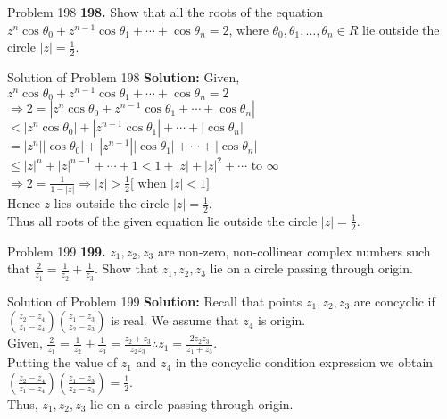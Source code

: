 \documentclass[aspectratio=169,8pt]{beamer}
\begin{document}
\begin{frame}{Problem 198}
  \textbf{198.} Show that all the roots of the equation $z^n\cos\theta_0 + z^{n - 1}\cos\theta_1 + \cdots + \cos\theta_n = 2$,
  where $\theta_0, \theta_1, \ldots, \theta_n\in R$ lie outside the circle $|z| = \frac{1}{2}$.
\end{frame}
\begin{frame}{Solution of Problem 198}
  \textbf{Solution:} Given, $z^n\cos\theta_0 + z^{n - 1}\cos\theta_1 + \cdots + \cos\theta_n = 2$\\
  \vspace*{0.2cm}
  $\Rightarrow 2 = |z^n\cos\theta_0 + z^{n - 1}\cos\theta_1 + \cdots + \cos\theta_n|$\\
  \vspace*{0.2cm}
  $< |z^n\cos\theta_0| + |z^{n - 1}\cos\theta_1| + \cdots + |\cos\theta_n|$\\
  \vspace*{0.2cm}
  $= |z^n||\cos\theta_0| + |z^{n - 1}||\cos\theta_1| + \cdots + |\cos\theta_n|$\\
  \vspace*{0.2cm}
  $\leq |z|^n + |z|^{n - 1}  + \cdots + 1 < 1 + |z| + |z|^2 + \cdots$ to $\infty$\\
  \vspace*{0.2cm}
  $\Rightarrow 2 = \frac{1}{1 - |z|} \Rightarrow |z| > \frac{1}{2} [$ when $|z| < 1]$\\
  \vspace*{0.2cm}
  Hence $z$ lies outside the circle $|z| = \frac{1}{2}$.\\
  \vspace*{0.2cm}
  Thus all roots of the given equation lie outside the circle $|z| = \frac{1}{2}$.
\end{frame}
\begin{frame}{Problem 199}
  \textbf{199.} $z_1, z_2, z_3$ are non-zero, non-collinear complex numbers such that $\frac{2}{z_1} = \frac{1}{z_2} +
  \frac{1}{z_3}$. Show that $z_1, z_2, z_3$ lie on a circle passing through origin.
\end{frame}
\begin{frame}{Solution of Problem 199}
  \textbf{Solution:} Recall that points $z_1, z_2, z_3$ are concyclic if $\left(\frac{z_2 - z_4}{z_1 - z_4}\right)\left(\frac{z_1 -
  z_3}{z_2 - z_3}\right)$ is real. We assume that $z_4$ is origin.\\
  \vspace*{0.2cm}
  Given, $\frac{2}{z_1} = \frac{1}{z_2} + \frac{1}{z_3} = \frac{z_2 + z_3}{z_2z_3} \therefore z_1 = \frac{2z_2z_3}{z_1+z_3}$.\\
  \vspace*{0.2cm}
  Putting the value of $z_1$ and $z_4$ in the concyclic condition expression we obtain\\
  \vspace*{0.2cm}
  $\left(\frac{z_2 - z_4}{z_1 - z_4}\right)\left(\frac{z_1 - z_3}{z_2 - z_3}\right) = \frac{1}{2}$.\\
  \vspace*{0.2cm}
  Thus, $z_1, z_2, z_3$ lie on a circle passing through origin.
\end{frame}
\end{document}
